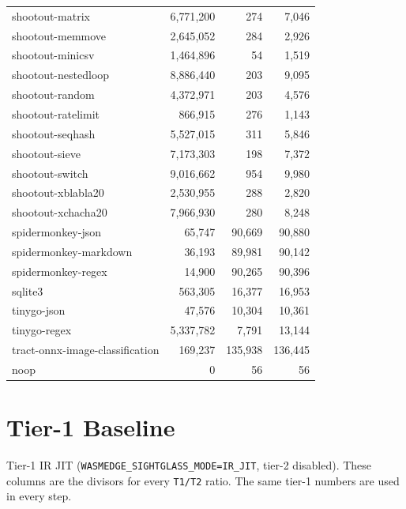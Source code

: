 \begin{longtable}{l r r r}
shootout-matrix & 6{,}771{,}200 & 274 & 7{,}046 \\
shootout-memmove & 2{,}645{,}052 & 284 & 2{,}926 \\
shootout-minicsv & 1{,}464{,}896 & 54 & 1{,}519 \\
shootout-nestedloop & 8{,}886{,}440 & 203 & 9{,}095 \\
shootout-random & 4{,}372{,}971 & 203 & 4{,}576 \\
shootout-ratelimit & 866{,}915 & 276 & 1{,}143 \\
shootout-seqhash & 5{,}527{,}015 & 311 & 5{,}846 \\
shootout-sieve & 7{,}173{,}303 & 198 & 7{,}372 \\
shootout-switch & 9{,}016{,}662 & 954 & 9{,}980 \\
shootout-xblabla20 & 2{,}530{,}955 & 288 & 2{,}820 \\
shootout-xchacha20 & 7{,}966{,}930 & 280 & 8{,}248 \\
spidermonkey-json & 65{,}747 & 90{,}669 & 90{,}880 \\
spidermonkey-markdown & 36{,}193 & 89{,}981 & 90{,}142 \\
spidermonkey-regex & 14{,}900 & 90{,}265 & 90{,}396 \\
sqlite3 & 563{,}305 & 16{,}377 & 16{,}953 \\
tinygo-json & 47{,}576 & 10{,}304 & 10{,}361 \\
tinygo-regex & 5{,}337{,}782 & 7{,}791 & 13{,}144 \\
tract-onnx-image-classification & 169{,}237 & 135{,}938 & 136{,}445 \\
noop & 0 & 56 & 56 \\
\end{longtable}

\section{Tier-1 Baseline}
\label{sec:appB:tier1}

Tier-1 IR JIT (\texttt{WASMEDGE\_SIGHTGLASS\_MODE=IR\_JIT}, tier-2 disabled). These columns are the divisors for every \texttt{T1/T2} ratio. The same tier-1 numbers are used in every step.

